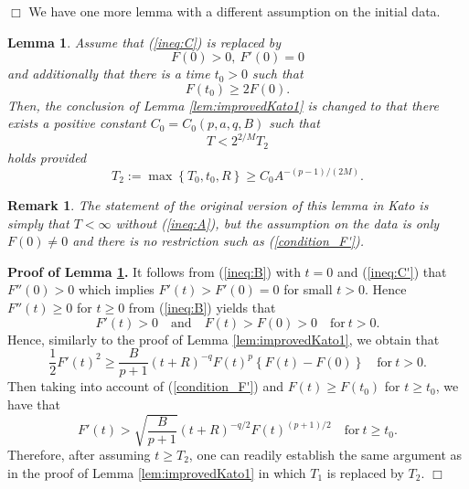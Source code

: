 \documentclass[a4paper,12pt]{article}
\numberwithin{equation}{section}
\newtheorem{lem}{Lemma}[section]
\newtheorem{rem}{Remark}[section]
\begin{document}
\hfill$\Box$ 
\vskip10pt
We have one more lemma with a different assumption on the initial data.
\begin{lem}
\label{lem:improvedKato2}
Assume that (\ref{ineq:C}) is replaced by
\begin{equation}
\label{ineq:C'}
F(0)>0,\ F'(0)=0
\end{equation}
and additionally that there is a time $t_0>0$ such that  
\begin{equation}
\label{condition_F'}
F(t_0)\ge 2F(0).
\end{equation}
Then, the conclusion of Lemma \ref{lem:improvedKato1} is changed to that
there exists a positive constant $C_0=C_0(p,a,q,B)$ such that
\begin{equation}
\label{est:T_2}
T<2^{2/M}T_2
\end{equation}
holds provided
\begin{equation}
\label{condi2}
T_2:=\max\left\{T_0,t_0,R\right\}\ge C_0 A^{-(p-1)/(2M)}.
\end{equation}
\end{lem}
\begin{rem}
\label{rem:Kato2}
The statement of the original version of this lemma in Kato \cite{Kato80}
is simply that $T<\infty$ without (\ref{ineq:A}), but the assumption on the data is only $F(0)\neq0$
and there is no restriction such as (\ref{condition_F'}).
\end{rem}
\par\noindent
{\bf Proof of Lemma \ref{lem:improvedKato2}.}
It follows from (\ref{ineq:B}) with $t=0$ and (\ref{ineq:C'}) that
$F''(0)>0$ which implies $F'(t)>F'(0)=0$ for small $t>0$. 
Hence $F''(t)\ge0$ for $t\ge0$ from (\ref{ineq:B}) yields that
\[
F'(t)>0\quad\mbox{and}\quad F(t)>F(0)>0\quad\mbox{for}\ t>0.
\]
Hence, similarly to the proof of Lemma \ref{lem:improvedKato1},
we obtain that
\[
\frac{1}{2}F'(t)^2\ge\frac{B}{p+1}(t+R)^{-q}F(t)^p\left\{F(t)-F(0)\right\}\quad\mbox{for}\ t>0.
\]
Then taking into account of (\ref{condition_F'}) and $F(t)\ge F(t_0)$ for $t\ge t_0$,
we have that
\[
F'(t)>\sqrt{\frac{B}{p+1}}(t+R)^{-q/2}F(t)^{(p+1)/2}
\quad\mbox{for}\ t\ge t_0.
\]
Therefore, after assuming $t\ge T_2$, one can readily establish the same argument
as in the proof of Lemma \ref{lem:improvedKato1} in which
$T_1$ is replaced by $T_2$.
\hfill$\Box$ 

\end{document}
